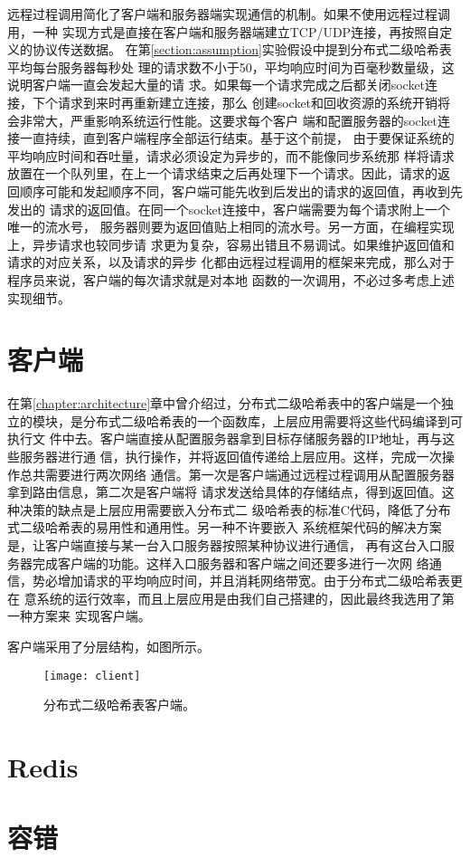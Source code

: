 远程过程调用简化了客户端和服务器端实现通信的机制。如果不使用远程过程调用，一种
实现方式是直接在客户端和服务器端建立TCP/UDP连接，再按照自定义的协议传送数据。
在第\ref{section:assumption}实验假设中提到分布式二级哈希表平均每台服务器每秒处
理的请求数不小于50，平均响应时间为百毫秒数量级，这说明客户端一直会发起大量的请
求。如果每一个请求完成之后都关闭socket连接，下个请求到来时再重新建立连接，那么
创建socket和回收资源的系统开销将会非常大，严重影响系统运行性能。这要求每个客户
端和配置服务器的socket连接一直持续，直到客户端程序全部运行结束。基于这个前提，
由于要保证系统的平均响应时间和吞吐量，请求必须设定为异步的，而不能像同步系统那
样将请求放置在一个队列里，在上一个请求结束之后再处理下一个请求。因此，请求的返
回顺序可能和发起顺序不同，客户端可能先收到后发出的请求的返回值，再收到先发出的
请求的返回值。在同一个socket连接中，客户端需要为每个请求附上一个唯一的流水号，
服务器则要为返回值贴上相同的流水号。另一方面，在编程实现上，异步请求也较同步请
求更为复杂，容易出错且不易调试。如果维护返回值和请求的对应关系，以及请求的异步
化都由远程过程调用的框架来完成，那么对于程序员来说，客户端的每次请求就是对本地
函数的一次调用，不必过多考虑上述实现细节。

\section{客户端}\label{section:client}
在第\ref{chapter:architecture}章中曾介绍过，分布式二级哈希表中的客户端是一个独
立的模块，是分布式二级哈希表的一个函数库，上层应用需要将这些代码编译到可执行文
件中去。客户端直接从配置服务器拿到目标存储服务器的IP地址，再与这些服务器进行通
信，执行操作，并将返回值传递给上层应用。这样，完成一次操作总共需要进行两次网络
通信。第一次是客户端通过远程过程调用从配置服务器拿到路由信息，第二次是客户端将
请求发送给具体的存储结点，得到返回值。这种决策的缺点是上层应用需要嵌入分布式二
级哈希表的标准C代码，降低了分布式二级哈希表的易用性和通用性。另一种不许要嵌入
系统框架代码的解决方案是，让客户端直接与某一台入口服务器按照某种协议进行通信，
再有这台入口服务器完成客户端的功能。这样入口服务器和客户端之间还要多进行一次网
络通信，势必增加请求的平均响应时间，并且消耗网络带宽。由于分布式二级哈希表更在
意系统的运行效率，而且上层应用是由我们自己搭建的，因此最终我选用了第一种方案来
实现客户端。

客户端采用了分层结构，如图\label{figure:client}所示。
\begin{figure}
  \centering
  \texttt{[image: client]}
  \caption[分布式二级哈希表客户端]{分布式二级哈希表客户端。}
  \label{figure:client}
\end{figure}

\section{Redis}\label{section:redis}

\section{容错}\label{section:fault}

